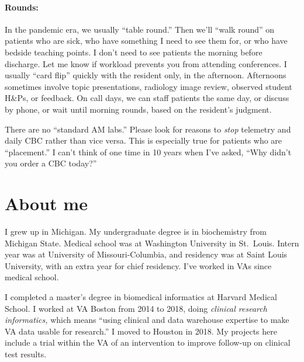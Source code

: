 \documentclass{tufte-handout}
\begin{document}
\paragraph{Rounds:} In the pandemic era, we usually ``table
round.'' Then we'll ``walk round'' on patients who are
sick, who have something I need to see them for, or who have bedside
teaching points. I don't need to see patients the morning before
discharge. Let me know if workload prevents you from attending
conferences. I usually ``card flip'' quickly with the resident only,
in the afternoon. Afternoons sometimes involve topic presentations,
radiology image review, observed student H\&Ps, or feedback. On call
days, we can staff patients the same day, or discuss by phone, or wait
until morning rounds, based on the resident's judgment.

There are no ``standard AM labs.'' Please look for reasons to
\emph{stop} telemetry and daily CBC rather than vice versa. This is
especially true for patients who are ``placement.'' I can't think of
one time in 10 years when I've asked, ``Why didn't you order a CBC
today?''





\section{About me}

I grew up in Michigan. My undergraduate degree is in biochemistry from
Michigan State. Medical school was at Washington University in
St.\ Louis. Intern year was at University of Missouri-Columbia, and
residency was at Saint Louis University, with an extra year for chief
residency. I've worked in VAs since medical school.


I completed a master's degree in biomedical informatics at Harvard
Medical School. I worked at VA Boston from 2014 to 2018, doing
\emph{clinical research informatics,} which means ``using clinical and
data warehouse expertise to make VA data usable for
research.'' I moved to Houston in 2018. My projects here
include a trial within the VA of an intervention to improve follow-up
on clinical test results.
\end{document}
